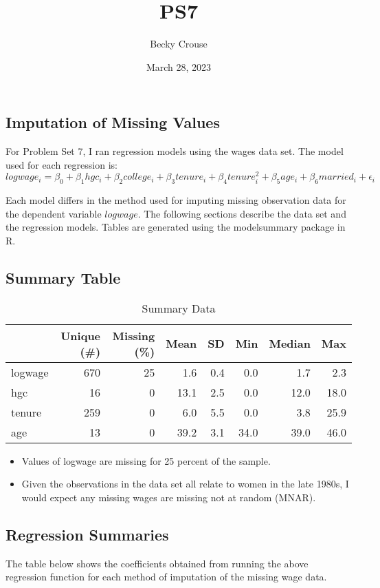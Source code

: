 \documentclass[nobib]{MSword}
\title{PS7}
\author{Becky Crouse}
\date{March 28, 2023}
\begin{document}
\maketitle

\subsection*{Imputation of Missing Values}
For Problem Set 7, I ran regression models using the wages data set. The model used for each regression is:
$$logwage_i=\beta_0+\beta_1 hgc_i+\beta_2 college_i+\beta_3 tenure_i + \beta_4 tenure^2_i + \beta_5 age_i + \beta_6 married_i + \epsilon_i$$

Each model differs in the method used for imputing missing observation data for the dependent variable $logwage$. The following sections describe the data set and the regression models. Tables are generated using the modelsummary package in R.

\subsection*{Summary Table}

\begin{table}[hbt!]
\centering
\caption{Summary Data}
\label{table:1}
\begin{tabular}[t]{lrrrrrrr}
\toprule
  & Unique (\#) & Missing (\%) & Mean & SD & Min & Median & Max\\
\midrule
logwage & 670 & 25 & \num{1.6} & \num{0.4} & \num{0.0} & \num{1.7} & \num{2.3}\\
hgc & 16 & 0 & \num{13.1} & \num{2.5} & \num{0.0} & \num{12.0} & \num{18.0}\\
tenure & 259 & 0 & \num{6.0} & \num{5.5} & \num{0.0} & \num{3.8} & \num{25.9}\\
age & 13 & 0 & \num{39.2} & \num{3.1} & \num{34.0} & \num{39.0} & \num{46.0}\\
\bottomrule
\end{tabular}
\end{table}

\begin{itemize}
\item Values of logwage are missing for 25 percent of the sample.
\item Given the observations in the data set all relate to women in the late 1980s, I would expect any missing wages are missing not at random (MNAR). 
\end{itemize}
\subsection*{Regression Summaries}
The table below shows the coefficients obtained from running the above regression function for each method of imputation of the missing wage data.
\end{document}
